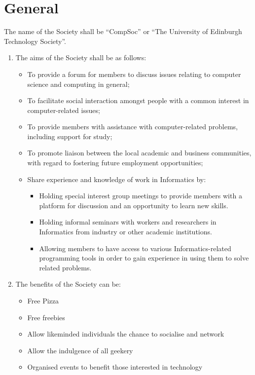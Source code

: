 \section{General}

The name of the Society shall be \enquote{CompSoc} or \enquote{The University of Edinburgh Technology Society}.

\begin{enumerate}

\item The aims of the Society shall be as follows:
  \begin{itemize}
  \item To provide a forum for members to discuss issues relating to computer science and computing in general;
  \item To facilitate social interaction amongst people with a common interest in computer-related issues;
  \item To provide members with assistance with computer-related problems, including support for study;
  \item To promote liaison between the local academic and business communities, with regard to fostering future employment opportunities;
  \item Share experience and knowledge of work in Informatics by:
    \begin{itemize}
    \item Holding special interest group meetings to provide members with a platform for discussion and an opportunity to learn new skills.
    \item Holding informal seminars with workers and researchers in Informatics from industry or other academic institutions.
    \item Allowing members to have access to various Informatics-related programming tools in order to gain experience in using them to solve related problems.
    \end{itemize}
  \end{itemize}

\item The benefits of the Society can be:
  \begin{itemize}
  \item Free Pizza
  \item Free freebies
  \item Allow likeminded individuals the chance to socialise and network
  \item Allow the indulgence of all geekery
  \item Organised events to benefit those interested in technology
  \end{itemize}


\end{enumerate}
